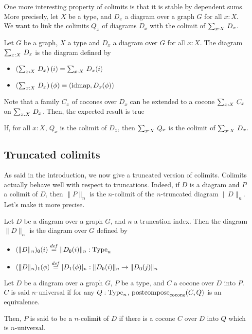 One more interesting property of colimits is that it is stable by
dependent sums. More precisely, let $X$ be a type, and $D_x$ a diagram
over a graph $G$ for all $x:X$. We want to link the colimits $Q_x$ of
diagrams $D_x$ with the colimit of $\sum_{x:X}\, D_x$.
\begin{defi}
  Let $G$ be a graph, $X$ a type and $D_x$ a diagram over $G$ for all
  $x:X$. The diagram $\sum_{x:X}\, D_x$ is the diagram defined by
  \begin{itemize}
  \item $\left( \sum_{x:X}\, D_x \right)(i) = \sum_{x:X}\, D_x(i)$
  \item $\left( \sum_{x:X}\, D_x \right)(\phi) = (\operatorname{\mathrm{idmap}}, D_x(\phi))$
  \end{itemize}
\end{defi}

Note that a family $C_x$ of cocones over $D_x$ can be extended to a
cocone $\sum_{x:X}\, C_x$ on $\sum_{x:X}\, D_x$. Then, the expected
result is true
\begin{prop}\label{prop:colimit-sigma}
  If, for all $x:X$, $Q_x$ is the colimit of $D_x$, then $\sum_{x:X}\, Q_x$ is the colimit of $\sum_{x:X}\, D_x$.
\end{prop}
 



\subsection{Truncated colimits}
\label{ssec:trunc_colim}

As said in the introduction, we now give a
truncated version of colimits. 
Colimits actually behave well with respect to truncations. Indeed, if $D$ is a
diagram and $P$ a colimit of $D$, then $\|P\|_n$ is the $n$-colimit
of the $n$-truncated diagram $\|D\|_n$. Let's make it more precise.

\begin{defi}
  Let $D$ be a diagram over a graph $G$, and $n$ a truncation index.
  Then the diagram $\|D\|_n$ is the diagram over $G$ defined by
  \begin{itemize}
  \item $(\|D\|_n)_0(i) \overset{de\hspace{-0.2ex}f}{=} \|D_0(i)\|_n:\operatorname{Type}_n$
  \item $(\|D\|_n)_1(\phi) \overset{de\hspace{-0.2ex}f}{=} |D_1(\phi)|_n : \|D_0(i)\|_n \to \|D_0(j)\|_n$
  \end{itemize}
\end{defi}

\begin{defi}
  Let $D$ be a diagram over a graph $G$, $P$ be a type, and $C$ a
  cocone over $D$ into $P$. $C$ is said $n$-universal if for any
  $Q:\operatorname{Type}_n$, $\operatorname{\mathrm{postcompose}}_{\mathrm{cocone}}(C,Q)$ is an
  equivalence.

  Then, $P$ is said to be a $n$-colimit of $D$ if there is a cocone
  $C$ over $D$ into $Q$ which is $n$-universal.
\end{defi}

